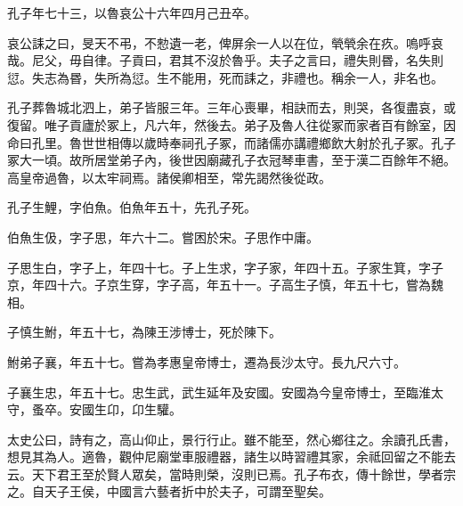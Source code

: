 孔子年七十三，以魯哀公十六年四月己丑卒。

哀公誄之曰，旻天不弔，不愸遺一老，俾屏余一人以在位，煢煢余在疚。嗚呼哀哉。尼父，毋自律。子貢曰，君其不沒於魯乎。夫子之言曰，禮失則昬，名失則愆。失志為昬，失所為愆。生不能用，死而誄之，非禮也。稱余一人，非名也。

孔子葬魯城北泗上，弟子皆服三年。三年心喪畢，相訣而去，則哭，各復盡哀，或復留。唯子貢廬於冢上，凡六年，然後去。弟子及魯人往從冢而家者百有餘室，因命曰孔里。魯世世相傳以歲時奉祠孔子冢，而諸儒亦講禮鄉飲大射於孔子冢。孔子冢大一頃。故所居堂弟子內，後世因廟藏孔子衣冠琴車書，至于漢二百餘年不絕。高皇帝過魯，以太牢祠焉。諸侯卿相至，常先謁然後從政。

孔子生鯉，字伯魚。伯魚年五十，先孔子死。

伯魚生伋，字子思，年六十二。嘗困於宋。子思作中庸。

子思生白，字子上，年四十七。子上生求，字子家，年四十五。子家生箕，字子京，年四十六。子京生穿，字子高，年五十一。子高生子慎，年五十七，嘗為魏相。

子慎生鮒，年五十七，為陳王涉博士，死於陳下。

鮒弟子襄，年五十七。嘗為孝惠皇帝博士，遷為長沙太守。長九尺六寸。

子襄生忠，年五十七。忠生武，武生延年及安國。安國為今皇帝博士，至臨淮太守，蚤卒。安國生卬，卬生驩。

太史公曰，詩有之，高山仰止，景行行止。雖不能至，然心鄉往之。余讀孔氏書，想見其為人。適魯，觀仲尼廟堂車服禮器，諸生以時習禮其家，余祗回留之不能去云。天下君王至於賢人眾矣，當時則榮，沒則已焉。孔子布衣，傳十餘世，學者宗之。自天子王侯，中國言六藝者折中於夫子，可謂至聖矣。
